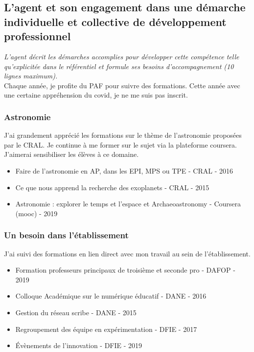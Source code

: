 \documentclass[11pt]{article}
\begin{document}
\newpage

\subsection{L’agent et son engagement dans une démarche individuelle et collective de développement professionnel}

\textit{L’agent décrit les démarches accomplies pour développer cette compétence telle qu’explicitée dans le référentiel et formule ses besoins d’accompagnement (10 lignes maximum).}\\

Chaque année, je profite du PAF pour suivre des formations. Cette année avec une certaine appréhension du covid, je ne me suis pas inscrit. 

\subsubsection{Astronomie}

J'ai grandement apprécié les formations sur le thème de l'astronomie proposées par le CRAL. Je continue à me former sur le sujet via la plateforme coursera. J'aimerai sensibiliser les élèves à ce domaine. 

\begin{itemize}
  \item Faire de l'astronomie en AP, dans les EPI, MPS ou TPE - CRAL - 2016
  \item Ce que nous apprend la recherche des exoplanets - CRAL - 2015
  \item Astronomie : explorer le temps et l'espace et Archaeoastronomy - Coursera (mooc) - 2019
\end{itemize}


\subsubsection{Un besoin dans l'établissement}

J'ai suivi des formations en lien direct avec mon travail au sein de l'établissement. 

\begin{itemize}
  \item Formation professeurs principaux de troisième et seconde pro - DAFOP - 2019
  \item Colloque Académique sur le numérique éducatif - DANE - 2016
  \item Gestion du réseau scribe - DANE - 2015
  \item Regroupement des équipe en expérimentation  - DFIE - 2017
  \item Évènements de l'innovation - DFIE - 2019
\end{itemize}
\end{document}
